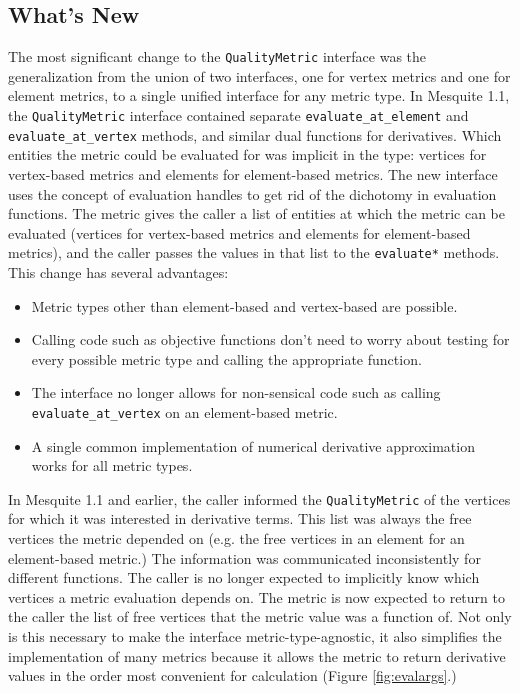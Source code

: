 \documentclass{article}
\begin{document}
\subsection{What's New}

The most significant change to the \texttt{QualityMetric} interface was the generalization from the union of two interfaces, one for vertex metrics and one for element metrics, to a single unified interface for any metric type.  In Mesquite 1.1, the \texttt{QualityMetric} interface contained separate \texttt{evaluate\_at\_element} and \texttt{evaluate\_at\_vertex} methods, and similar dual functions for derivatives.  Which entities the metric could be evaluated for was implicit in the type: vertices for vertex-based metrics and elements for element-based metrics.  The new interface uses the concept of evaluation handles to get rid of the dichotomy in evaluation functions.  The metric gives the caller a list of entities at which the metric can be evaluated (vertices for vertex-based metrics and elements for element-based metrics), and the caller passes the values in that list to the \texttt{evaluate*} methods.  This change has several advantages:
\begin{itemize}
\item Metric types other than element-based and vertex-based are possible.
\item Calling code such as objective functions don't need to worry about testing for every possible metric type and calling the appropriate function.
\item The interface no longer allows for non-sensical code such as calling \texttt{evaluate\_at\_vertex} on an element-based metric.
\item A single common implementation of numerical derivative approximation works for all metric types.
\end{itemize}

In Mesquite 1.1 and earlier, the caller informed the \texttt{QualityMetric} of the vertices for which it was interested in derivative terms.  This list was always the free vertices the metric depended on (e.g. the free vertices in an element for an element-based metric.)  The information was communicated inconsistently for different functions.  The caller is no longer expected to implicitly know which vertices a metric evaluation depends on.  The metric is now expected to return to the caller the list of free vertices that the metric value was a function of.  Not only is this necessary to make the interface metric-type-agnostic, it also simplifies the implementation of many metrics because it allows the metric to return derivative values in the order most convenient for calculation (Figure \ref{fig:evalargs}.)
\end{document}
